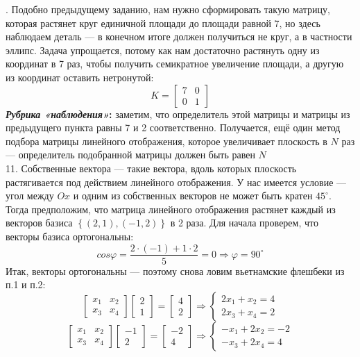 \documentclass[a3paper,14pt]{extarticle}
\begin{document}
. Подобно предыдущему заданию, нам нужно сформировать такую матрицу, которая растянет круг единичной площади до площади равной 7, но здесь наблюдаем деталь --- в конечном итоге должен получиться не круг, а в частности эллипс. Задача упрощается, потому как нам достаточно растянуть одну из координат в 7 раз, чтобы получить семикратное увеличение площади, а другую из координат оставить нетронутой:
$$K = \begin{bmatrix}
    7 & 0 \\ 0 & 1
\end{bmatrix}$$
\textbf{\textit{Рубрика «наблюдения»}:} заметим, что определитель этой матрицы и матрицы из предыдущего пункта равны 7 и 2 соответственно. Получается, ещё один метод подбора матрицы линейного отображения, которое увеличивает плоскость в $N$ раз --- определитель подобранной матрицы должен быть равен $N$\\[1.5em]
11. Собственные вектора --- такие вектора, вдоль которых плоскость растягивается под действием линейного отображения. У нас имеется условие --- угол между $Ox$ и одним из собственных векторов не может быть кратен $45^\circ$. Тогда предположим, что матрица линейного отображения растянет каждый из векторов базиса $\left\{(2, 1), (-1, 2)\right\}$ в 2 раза. Для начала проверем, что векторы базиса ортогональны:
$$cos\varphi = \frac{2\cdot(-1)+1\cdot2}{5} = 0 \Rightarrow \varphi = 90^\circ$$
Итак, векторы ортогональны --- поэтому снова ловим вьетнамские флешбеки из п.1 и п.2:
$$\begin{bmatrix}
    x_1 & x_2 \\ x_3 & x_4
\end{bmatrix}\begin{bmatrix}
    2 \\ 1
\end{bmatrix} = \begin{bmatrix}
    4 \\ 2
\end{bmatrix} \Rightarrow \begin{cases}
    2x_1 + x_2 = 4 \\ 2x_3 + x_4 = 2
\end{cases}$$
$$\begin{bmatrix}
    x_1 & x_2 \\ x_3 & x_4
\end{bmatrix}\begin{bmatrix}
    -1 \\ 2
\end{bmatrix} = \begin{bmatrix}
    -2 \\ 4
\end{bmatrix} \Rightarrow \begin{cases}
    -x_1 + 2x_2 = -2 \\ -x_3 + 2x_4 = 4
\end{cases}$$
\end{document}
